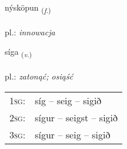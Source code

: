 \documentclass[frontgrid, backgrid]{flacards}\usepackage[]{graphicx}\usepackage[]{xcolor}
\begin{document}
\renewcommand{\flhead}{\vskip5pt \fboxsep=0pt {\small\bfseries\footnotesize Nafnorð | rzeczownik}}
\renewcommand{\fcfoot}{\vskip5pt \fboxsep=0pt \hspace{2pt}{\small\bfseries\footnotesize 3K}}

\renewcommand{\blhead}{\vskip5pt {\small\bfseries\footnotesize Nafnorð | rzeczownik }}
\renewcommand{\bcfoot}{\vskip5pt \hspace{2pt}{\small\bfseries\footnotesize 3K}}


{nýsköpun \small{\textsubscript{(\textit{f.})}} \\[1ex] %
\textphonetic{[niːskœpʏn]} \\
pl.: \emph{innowacja} \\  [2ex]
\renewcommand*{\arraystretch}{0.8}
}

\renewcommand{\flhead}{\vskip5pt \fboxsep=0pt {\small\bfseries\footnotesize Sagnorð | czasownik}}
\renewcommand{\fcfoot}{\vskip5pt \fboxsep=0pt \hspace{2pt}{\small\bfseries\footnotesize 3K}}

\renewcommand{\blhead}{\vskip5pt {\small\bfseries\footnotesize Sagnorð | czasownik }}
\renewcommand{\bcfoot}{\vskip5pt \hspace{2pt}{\small\bfseries\footnotesize 3K}}


{síga \small{\textsubscript{(\textit{v.})}} \\[1ex] %
\textphonetic{[siːɣa]} \\
pl.: \emph{zatonąć; osiąść} \\  [2ex]
\renewcommand*{\arraystretch}{0.8}
\begin{tabular}{p{1cm}l}
\textsc{1sg}: & síg -- seig -- sigið \\ 
\textsc{2sg}: & sígur -- seigst -- sigið \\ 
\textsc{3sg}: & sígur -- seig -- sigið \\ 
\end{tabular}
}
\end{document}
